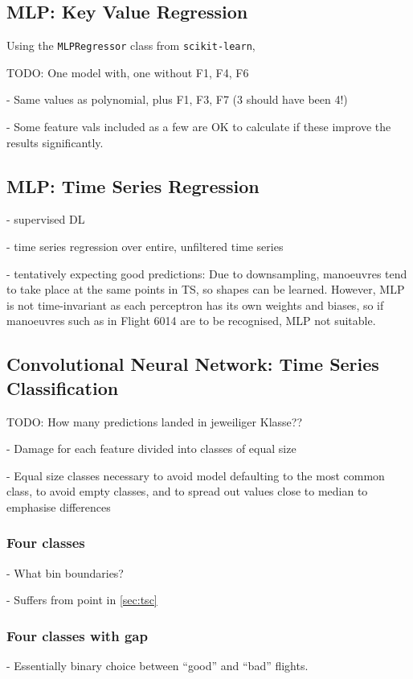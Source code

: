 \subsection{MLP: Key Value Regression}
Using the \texttt{MLPRegressor} class from \texttt{scikit-learn},

TODO: One model with, one without F1, F4, F6

- Same values as polynomial, plus F1, F3, F7 (3 should have been 4!)

- Some feature vals included as a few are OK to calculate if these improve the results significantly.

\subsection{MLP: Time Series Regression}
- supervised DL

- time series regression over entire, unfiltered time series

- tentatively expecting good predictions: Due to downsampling, manoeuvres tend to take place at the same points in TS, so shapes can be learned. However, MLP is not time-invariant as each perceptron has its own weights and biases, so if manoeuvres such as in Flight 6014 are to be recognised, MLP not suitable.

\subsection{Convolutional Neural Network: Time Series Classification}

TODO: How many predictions landed in jeweiliger Klasse??

- Damage for each feature divided into classes of equal size

- Equal size classes necessary to avoid model defaulting to the most common class, to avoid empty classes, and to spread out values close to median to emphasise differences

\subsubsection{Four classes}
- What bin boundaries?

- Suffers from point in \ref{sec:tsc}

\subsubsection{Four classes with gap}
- Essentially binary choice between ``good'' and ``bad'' flights.

